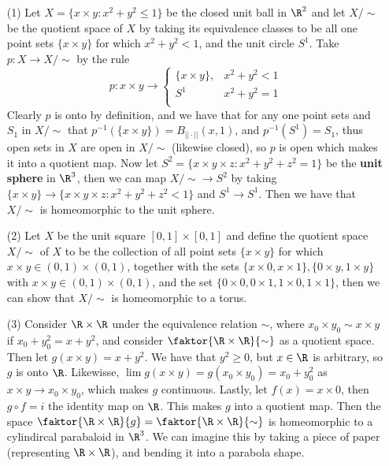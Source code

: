 \begin{example}
    \begin{enumerate}
        \item[(1)] Let $X=\{x \times y: x^2+y^2 \leq 1\}$ be the closed unit ball
            in $\R^2$ and let  $X/\sim$ be the
    quotient space of  $X$ by taking its equivalence classes to be all one point
    sets $\{x \times y\}$ for which $x^2+y^2<1$, and the unit circle  $S^1$. Take
    $p:X \rightarrow X/\sim$ by the rule
        \begin{equation*}
            p:x \times y \rightarrow \begin{cases}
                \{x \times y\}, & x^2+y^2<1 \\
                S^1        & x^2+y^2=1 \\
                      \end{cases}
        \end{equation*}
    Clearly $p$ is onto by definition, and we have that for any one point sets and
    $S_1$ in $X/\sim$ that  $p^{-1}(\{x \times y\})=B_{||\cdot||}(x,1)$, and
    $p^{-1}(S^1)=S_1$, thus open sets in $X$ are open in  $X/\sim$  (likewise
    closed), so $p$ is open which makes it into a quotient map. Now let
    $S^2=\{x \times y \times z: x^2+y^2+z^2=1\}$ be the \textbf{unit sphere} in
    $\R^3$, then we can map  $X/\sim \rightarrow S^2$ by taking  $\{x \times y\}
    \rightarrow \{x \times y \times z: x^2+y^2+z^2<1\}$ and $ S^1 \rightarrow S^1$.
    Then we have that $X/\sim$ is homeomorphic to the unit sphere.

        \item[(2)] Let $X$ be the unit square  $[0,1] \times [0,1]$ and define
            the quotient space $X/\sim$ of $X$ to be the collection of all point
            sets $\{x \times y\}$ for which $x \times y \in (0,1) \times (0,1)$,
            together with the sets $\{x \times 0, x \times 1\}, \{0 \times y, 1
            \times y\}$ with $x \times y \in (0,1) \times (0,1)$, and the set
            $\{0 \times 0, 0 \times 1, 1 \times 0, 1 \times 1\}$, then we can
            show that $X/\sim$ is
            homeomorphic to a torus.

        \item[(3)] Consider $\R \times \R$ under the equivalence relation
            $\sim$, where  $x_0 \times y_0 \sim x \times y$ if
            $x_0+y_0^2=x+y^2$, and consider $\faktor{\R \times \R}{\sim}$ as a
            quotient space. Then let $g(x \times y)=x+y^2$. We have that $y^2
            \geq 0$, but  $x \in \R$ is arbitrary, so  $g$ is onto  $\R$.
            Likewisse,  $\lim{g(x \times y)}=g(x_0 \times y_0)=x_0+y_0^2$ as
            $x \times y \rightarrow x_0 \times y_0$, which makes $g$ continuous.
            Lastly, let  $f(x)=x \times 0$, then $g \circ f=i$ the identity map
            on  $\R$. This makes $g$ into a quotient map. Then the space
            $\faktor{\R \times \R}{g}=\faktor{\R \times \R}{\sim}$ is
            homeomorphic to a cylindircal parabaloid in $\R^3$. We can imagine
            this by taking a piece of paper  (representing $\R \times \R$), and
            bending it into a parabola shape.


\end{enumerate}
\end{example}

